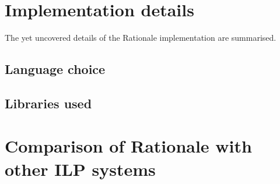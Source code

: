 \section{Implementation details}
The yet uncovered details of the Rationale implementation are summarised.

\subsection{Language choice}

\subsection{Libraries used}

\section{Comparison of Rationale with other ILP systems}
